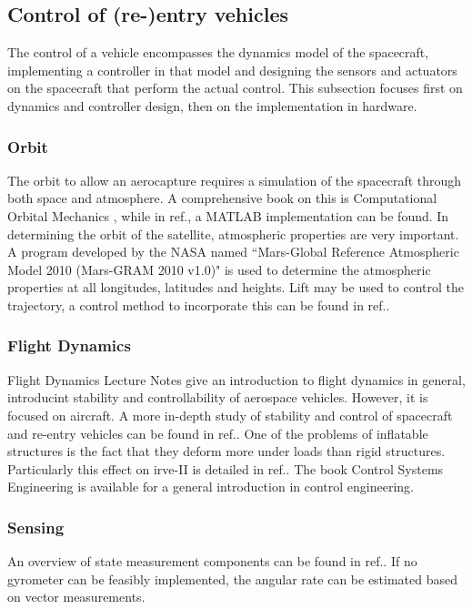 \subsection{Control of (re-)entry vehicles} \label{sec:control}
The control of a vehicle encompasses the dynamics model of the spacecraft, implementing a controller in that model and designing the sensors and actuators on the spacecraft that perform the actual control. This subsection focuses first on dynamics and controller design, then on the implementation in hardware.

\subsubsection{Orbit}
The orbit to allow an aerocapture requires a simulation of the spacecraft through both space and atmosphere. A comprehensive book on this is Computational Orbital Mechanics \cite{Weiland2004}, while in ref.\cite{Leszczynski1998}, a MATLAB implementation can be found. In determining the orbit of the satellite, atmospheric properties are very important. A program developed by the NASA named ``Mars-Global Reference Atmospheric Model 2010 (Mars-GRAM 2010 v1.0)" is used to determine the atmospheric properties at all longitudes, latitudes and heights.\cite{Justus2001} Lift may be used to control the trajectory, a control method to incorporate this can be found in ref.\cite{Esmaelzadeh2010}.

\subsubsection{Flight Dynamics}
Flight Dynamics Lecture Notes give an introduction to flight dynamics in general, introducint stability and controllability of aerospace vehicles. However, it is focused on aircraft. \cite{Mulder2013} A more in-depth study of stability and control of spacecraft and re-entry vehicles can be found in ref.\cite{Steketee1967, Ito2002}. One of the problems of inflatable structures is the fact that they deform more under loads than rigid structures.\cite{Axdahl2009} Particularly this effect on \gls{irve}-II is detailed in ref.\cite{Bose2009}. The book Control Systems Engineering is available for a general introduction in control engineering.\cite{Nise2011}

\subsubsection{Sensing}
An overview of state measurement components can be found in ref.\cite{Wertz2011}. If no gyrometer can be feasibly implemented, the angular rate can be estimated based on vector measurements.\cite{Azor1998}

